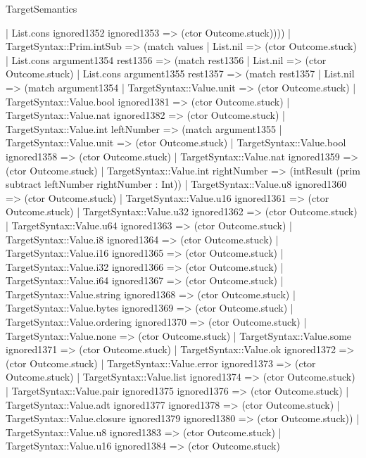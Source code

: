 \begin{lexlean}{TargetSemantics}
\begin{semanticmodule}
{          | List.cons ignored1352 ignored1353 => (ctor Outcome.stuck))))
    | TargetSyntax::Prim.intSub => (match values
      | List.nil => (ctor Outcome.stuck)
      | List.cons argument1354 rest1356 => (match rest1356
        | List.nil => (ctor Outcome.stuck)
        | List.cons argument1355 rest1357 => (match rest1357
          | List.nil => (match argument1354
            | TargetSyntax::Value.unit => (ctor Outcome.stuck)
            | TargetSyntax::Value.bool ignored1381 => (ctor Outcome.stuck)
            | TargetSyntax::Value.nat ignored1382 => (ctor Outcome.stuck)
            | TargetSyntax::Value.int leftNumber => (match argument1355
              | TargetSyntax::Value.unit => (ctor Outcome.stuck)
              | TargetSyntax::Value.bool ignored1358 => (ctor Outcome.stuck)
              | TargetSyntax::Value.nat ignored1359 => (ctor Outcome.stuck)
              | TargetSyntax::Value.int rightNumber => (intResult (prim subtract leftNumber rightNumber : Int))
              | TargetSyntax::Value.u8 ignored1360 => (ctor Outcome.stuck)
              | TargetSyntax::Value.u16 ignored1361 => (ctor Outcome.stuck)
              | TargetSyntax::Value.u32 ignored1362 => (ctor Outcome.stuck)
              | TargetSyntax::Value.u64 ignored1363 => (ctor Outcome.stuck)
              | TargetSyntax::Value.i8 ignored1364 => (ctor Outcome.stuck)
              | TargetSyntax::Value.i16 ignored1365 => (ctor Outcome.stuck)
              | TargetSyntax::Value.i32 ignored1366 => (ctor Outcome.stuck)
              | TargetSyntax::Value.i64 ignored1367 => (ctor Outcome.stuck)
              | TargetSyntax::Value.string ignored1368 => (ctor Outcome.stuck)
              | TargetSyntax::Value.bytes ignored1369 => (ctor Outcome.stuck)
              | TargetSyntax::Value.ordering ignored1370 => (ctor Outcome.stuck)
              | TargetSyntax::Value.none => (ctor Outcome.stuck)
              | TargetSyntax::Value.some ignored1371 => (ctor Outcome.stuck)
              | TargetSyntax::Value.ok ignored1372 => (ctor Outcome.stuck)
              | TargetSyntax::Value.error ignored1373 => (ctor Outcome.stuck)
              | TargetSyntax::Value.list ignored1374 => (ctor Outcome.stuck)
              | TargetSyntax::Value.pair ignored1375 ignored1376 => (ctor Outcome.stuck)
              | TargetSyntax::Value.adt ignored1377 ignored1378 => (ctor Outcome.stuck)
              | TargetSyntax::Value.closure ignored1379 ignored1380 => (ctor Outcome.stuck))
            | TargetSyntax::Value.u8 ignored1383 => (ctor Outcome.stuck)
            | TargetSyntax::Value.u16 ignored1384 => (ctor Outcome.stuck)
}
\end{semanticmodule}
\end{lexlean}
